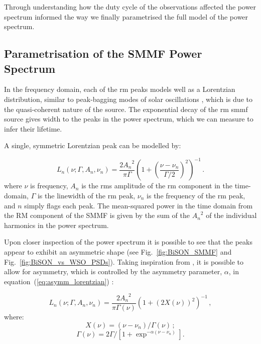 Through understanding how the duty cycle of the observations affected the power spectrum informed the way we finally parametrised the full model of the power spectrum.


\subsection{Parametrisation of the SMMF Power Spectrum}

In the frequency domain, each of the \gls{rm} peaks models well as a Lorentzian distribution, similar to peak-bagging modes of solar oscillations \citep{handberg_bayesian_2011, davies_low-frequency_2014}, which is due to the quasi-coherent nature of the source. The exponential decay of the \gls{rm} \gls{smmf} source gives width to the peaks in the power spectrum, which we can measure to infer their lifetime.

A single, symmetric Lorentzian peak can be modelled by:

\begin{equation}
L_n(\nu; \Gamma, A_n, \nu_n) = \frac{2{A_n}^2}{\pi \Gamma} \left(1 + \left(\frac{\nu - \nu_{n}}{\Gamma /2}\right)^2\right)^{-1} \, .
\label{eq:symm_lorentzian}
\end{equation}
%
where $\nu$ is frequency, $A_n$ is the \gls{rms} amplitude of the \gls{rm} component in the time-domain, $\Gamma$ is the linewidth of the \gls{rm} peak, $\nu_n$ is the frequency of the \gls{rm} peak, and $n$ simply flags each peak. The mean-squared power in the time domain from the RM component of the SMMF is given by the sum of the ${A_n}^2$ of the individual harmonics in the power spectrum.

Upon closer inspection of the power spectrum it is possible to see that the peaks appear to exhibit an asymmetric shape (see Fig.~\ref{fig:BiSON_SMMF} and Fig.~\ref{fig:BiSON_vs_WSO_PSDs}). Taking inspiration from \citet{howe_solar_2020}, it is possible to allow for asymmetry, which is controlled by the asymmetry parameter, $\alpha$, in equation~(\ref{eq:asymm_lorentzian}) \citep{stancik_simple_2008}:

\begin{equation}
L_n(\nu; \Gamma, A_n, \nu_n) = \frac{2{A_n}^2}{\pi \Gamma(\nu)} \left(1 + \left(2X(\nu)\right)^2\right)^{-1} \, ,
\label{eq:asymm_lorentzian}
\end{equation}
%
where:
%
\begin{equation}
X(\nu) = (\nu - \nu_n)/\Gamma(\nu) \, ;
\label{eq:asymm_freq}
\end{equation}
%
\begin{equation}
\Gamma(\nu) = 2\Gamma / [1 + \exp^{-\alpha(\nu - \nu_n)}] .
\label{eq:asymm_width}
\end{equation}

